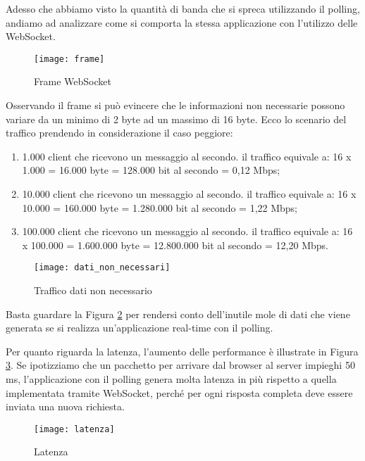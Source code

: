 Adesso che abbiamo visto la quantità di banda che si spreca utilizzando il polling, 
andiamo ad analizzare come si comporta la stessa applicazione con l'utilizzo delle WebSocket.
\begin{figure}[htpb!]
  \centering
  \texttt{[image: frame]}
  \caption{Frame WebSocket}
  \label{fig:frame}
\end{figure}
Osservando il frame si può evincere che le informazioni non necessarie possono variare da un minimo di 2 byte ad un massimo di 16 byte.
Ecco lo scenario del traffico prendendo in considerazione il caso peggiore:
\begin{enumerate}
\item 1.000 client che ricevono un messaggio al secondo.
il traffico equivale a: 16 x 1.000 = 16.000 byte = 128.000 bit al secondo = 0,12 Mbps;
\item 10.000 client che ricevono un messaggio al secondo.
il traffico equivale a: 16 x 10.000 = 160.000 byte = 1.280.000 bit al secondo = 1,22 Mbps;
\item 100.000  client che ricevono un messaggio al secondo.
il traffico equivale a: 16 x 100.000 = 1.600.000 byte = 12.800.000 bit al secondo = 12,20 Mbps.
\end{enumerate}
\begin{figure}[htpb!]
  \centering
  \texttt{[image: dati\_non\_necessari]}
  \caption{Traffico dati non necessario}
  \label{fig:traffico}
\end{figure}
Basta guardare la Figura \ref{fig:traffico} per rendersi conto dell'inutile mole di dati che viene generata se si realizza un'applicazione real-time con il polling.

Per quanto riguarda la latenza, l'aumento delle performance è illustrate in Figura \ref{fig:latenza}.
Se ipotizziamo che un pacchetto per arrivare dal browser al server impieghi 50 ms, l'applicazione con il polling genera molta latenza in più rispetto a quella implementata tramite WebSocket, 
perché per ogni risposta completa deve essere inviata una nuova richiesta.    
\begin{figure}[htpb!]
  \centering
  \texttt{[image: latenza]}
  \caption{Latenza}
  \label{fig:latenza}
\end{figure}
